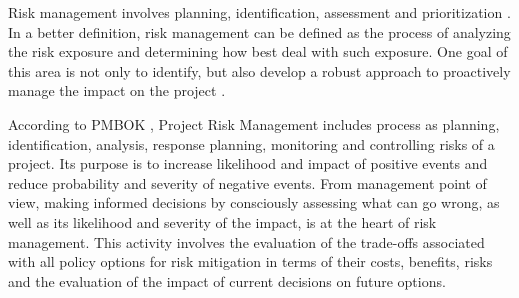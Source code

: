 Risk management involves planning, identification, assessment and prioritization . In a better definition, risk management can be defined as the process of analyzing the risk exposure and determining how best deal with such exposure. One goal of this area is not only to identify, but also develop a robust approach to proactively manage the impact on the project \cite{OSUNDAHUNSI2012}.

According to PMBOK \cite{PMBOK2008}, Project Risk Management includes process as planning, identification, analysis, response planning, monitoring and controlling risks of a project. Its purpose is to increase likelihood and impact of positive events and reduce probability and severity of negative events. From management point of view, making informed decisions by consciously assessing what can go wrong, as well as its likelihood and severity of the impact, is at the heart of risk management. This activity involves the evaluation of the trade-offs associated with all policy options for risk mitigation in terms of their costs, benefits, risks and the evaluation of the impact of current decisions on future options.

